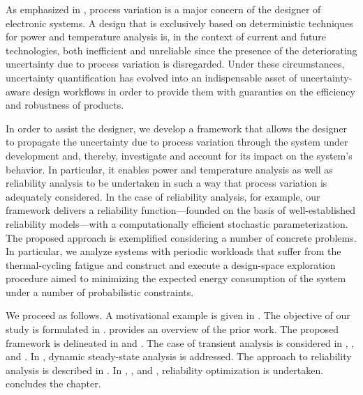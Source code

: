 As emphasized in , process variation is a major
concern of the designer of electronic systems. A design that is exclusively
based on deterministic techniques for power and temperature analysis is, in the
context of current and future technologies, both inefficient and unreliable
since the presence of the deteriorating uncertainty due to process variation is
disregarded. Under these circumstances, uncertainty quantification
\cite{maitre2010} has evolved into an indispensable asset of uncertainty-aware
design workflows in order to provide them with guaranties on the efficiency and
robustness of products.

In order to assist the designer, we develop a framework that allows the designer
to propagate the uncertainty due to process variation through the system under
development and, thereby, investigate and account for its impact on the system's
behavior. In particular, it enables power and temperature analysis as well as
reliability analysis to be undertaken in such a way that process variation is
adequately considered. In the case of reliability analysis, for example, our
framework delivers a reliability function---founded on the basis of
well-established reliability models---with a computationally efficient
stochastic parameterization. The proposed approach is exemplified considering a
number of concrete problems. In particular, we analyze systems with periodic
workloads that suffer from the thermal-cycling fatigue and construct and execute
a design-space exploration procedure aimed to minimizing the expected energy
consumption of the system under a number of probabilistic constraints.

We proceed as follows. A motivational example is given in .
The objective of our study is formulated in .
 provides an overview of the prior work. The proposed
framework is delineated in  and
. The case of transient analysis is considered
in , , and
. In ,
dynamic steady-state analysis is addressed. The approach to reliability analysis
is described in . In
, , and
, reliability optimization is undertaken.
 concludes the chapter.
